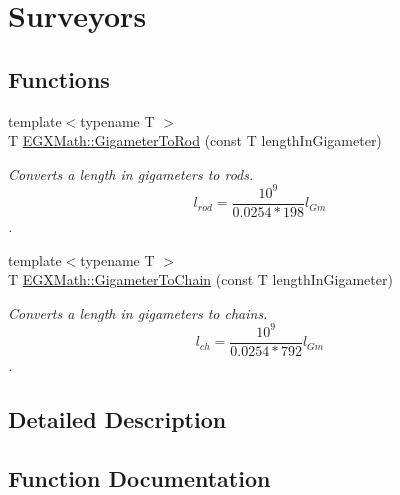\hypertarget{group___e_g_x_math-_conversions-_length_conversions-_gigameter-_surveyors}{}\section{Surveyors}
\label{group___e_g_x_math-_conversions-_length_conversions-_gigameter-_surveyors}
\subsection*{Functions}
\begin{DoxyCompactItemize}
\item 
{\footnotesize template$<$typename T $>$ }\\T \mbox{\hyperlink{group___e_g_x_math-_conversions-_length_conversions-_gigameter-_surveyors_ga73a408111b846e3cb97aa1990135ec46}{E\+G\+X\+Math\+::\+Gigameter\+To\+Rod}} (const T length\+In\+Gigameter)
\begin{DoxyCompactList}\small\item\em Converts a length in gigameters to rods. \[ l_{rod}= \frac{10^{9}}{0.0254 * 198} l_{Gm} \]. \end{DoxyCompactList}\item 
{\footnotesize template$<$typename T $>$ }\\T \mbox{\hyperlink{group___e_g_x_math-_conversions-_length_conversions-_gigameter-_surveyors_ga1ed5bf3c72c4a51beebcddf4f7e87631}{E\+G\+X\+Math\+::\+Gigameter\+To\+Chain}} (const T length\+In\+Gigameter)
\begin{DoxyCompactList}\small\item\em Converts a length in gigameters to chains. \[ l_{ch}= \frac{10^{9}}{0.0254 * 792} l_{Gm} \]. \end{DoxyCompactList}\end{DoxyCompactItemize}


\subsection{Detailed Description}


\subsection{Function Documentation}
\mbox{\label{group___e_g_x_math-_conversions-_length_conversions-_gigameter-_surveyors_ga1ed5bf3c72c4a51beebcddf4f7e87631}} 
